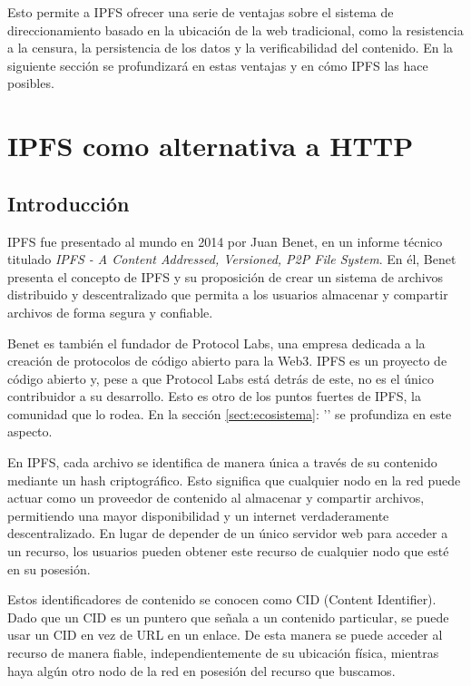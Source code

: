 Esto permite a IPFS ofrecer una serie de ventajas sobre el sistema de direccionamiento basado en la ubicación de la web
tradicional, como la resistencia a la censura, la persistencia de los datos y la verificabilidad del contenido.
En la siguiente sección se profundizará en estas ventajas y en cómo IPFS las hace posibles.

\section{IPFS como alternativa a HTTP}\label{sect:ipfs}

\subsection{Introducción}
IPFS fue presentado al mundo en 2014 por Juan Benet, en un informe técnico titulado
\textit{IPFS - A Content Addressed, Versioned, P2P File System}\cite{benetIPFSContentAddressed2014}.
En él, Benet presenta el concepto de IPFS y su proposición de crear un sistema de archivos
distribuido y descentralizado que permita a los usuarios almacenar y compartir archivos de forma segura y confiable.

Benet es también el fundador de Protocol Labs\cite{ProtocolLabs}, una empresa dedicada a la creación de protocolos de código abierto para la Web3.
IPFS es un proyecto de código abierto y, pese a que Protocol Labs está detrás de este, no es el único contribuidor a su desarrollo. Esto es otro
de los puntos fuertes de IPFS, la comunidad que lo rodea.   En la sección \ref{sect:ecosistema}: '' se profundiza en este aspecto.

En IPFS, cada archivo se identifica de manera única a través de su contenido mediante un hash criptográfico. Esto significa que
cualquier nodo en la red puede actuar como un proveedor de contenido al almacenar y compartir archivos, permitiendo una mayor
disponibilidad y un internet verdaderamente descentralizado. En lugar de depender de un único servidor web para acceder a un
recurso, los usuarios pueden obtener este recurso de cualquier nodo que esté en su posesión.

Estos identificadores de contenido se conocen como CID (Content Identifier). Dado que un CID es un puntero que señala a un contenido particular, se puede usar un CID en vez de URL en un enlace. De esta manera
se puede acceder al recurso de manera fiable, independientemente de su ubicación física, mientras haya algún otro nodo de la red en posesión del
recurso que buscamos.

